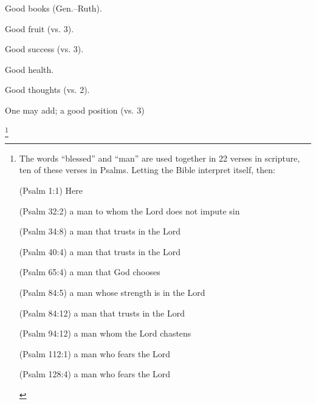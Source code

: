 {\begin{compactenum}
\item Good books (Gen.–Ruth).
\item Good fruit (vs. 3).
\item Good success (vs. 3).
\item Good health.
\item  Good thoughts (vs. 2).
\item One may add; a good position (vs. 3)
\end{compactenum} } \footnote{The words ``blessed'' and ``man'' are used together in 22 verses in scripture, ten of these verses in Psalms.  Letting the Bible interpret itself, then:\begin{compactenum}
    \item (Psalm 1:1) Here
    \item (Psalm 32:2) a man to whom the Lord does not impute sin
    \item (Psalm 34:8) a man that trusts in the Lord
    \item (Psalm 40:4) a man that trusts in the Lord
    \item (Psalm 65:4) a man that God chooses
    \item (Psalm 84:5) a man whose strength is in the Lord
    \item (Psalm 84:12) a man that trusts in the Lord
    \item (Psalm 94:12) a man whom the Lord chastens
    \item (Psalm 112:1) a man who fears the Lord
    \item (Psalm 128:4)  a man who fears the Lord
\end{compactenum} }
